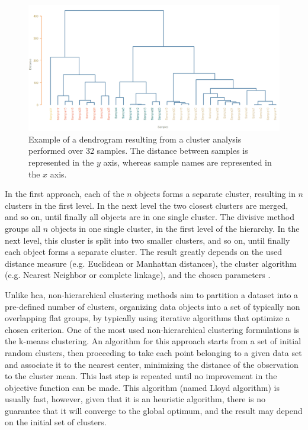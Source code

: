 \begin{figure}
	\centering
	\includegraphics[width=1\linewidth]{Imagens/clustering}
	\caption{Example of a dendrogram resulting from a cluster analysis performed over 32 samples. The distance between samples is represented in the $ y $ axis, whereas sample names are represented in the $ x $ axis.}
	\label{clustering}
\end{figure}


In the first approach, each of the $ n $ objects forms a separate cluster, resulting in $ n $ clusters in the first level. In the next level the two closest clusters are merged, and so on, until finally all objects are in one single cluster. The divisive method groups all $ n $ objects in one single cluster, in the first level of the hierarchy. In the next level, this cluster is split into two smaller clusters, and so on, until finally each object forms a separate cluster. The result greatly depends on the used distance measure (e.g. Euclidean or Manhattan distances), the cluster algorithm (e.g. Nearest Neighbor or complete linkage), and the chosen parameters \citep{varmuza2009introduction}.

Unlike \gls{hca}, non-hierarchical clustering methods aim to partition a dataset into a pre-defined number of clusters, organizing data objects into a set of typically non overlapping flat groups, by typically using iterative algorithms that optimize a chosen criterion. One of the most used non-hierarchical clustering formulations is the k-means clustering. An algorithm for this approach starts from a set of initial random clusters, then proceeding to take each point belonging  to a  given data set and associate it to the nearest center, minimizing the distance of the observation to the cluster mean. This last step is repeated until no improvement in the objective function can be made. This algorithm (named Lloyd algorithm) is usually fast, however, given that it is an heuristic algorithm, there is no guarantee that it will converge to the global optimum, and the result may depend on the initial set of clusters.




